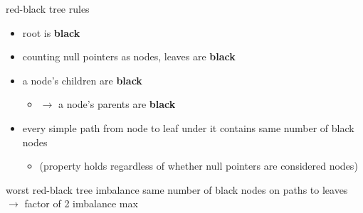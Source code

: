 \begin{frame}{red-black tree rules}
    \begin{itemize}
    \item root is \textbf{black}
    \item counting null pointers as nodes, leaves are \textbf{black}
    \item a  node's children are \textbf{black}
        \begin{itemize}
            \item $\rightarrow$ a  node's parents are \textbf{black}
        \end{itemize}
    \item every simple path from node to leaf under it contains same number of black nodes
            \begin{itemize}
                \item (property holds regardless of whether null pointers are considered nodes)
            \end{itemize}
    \end{itemize}
\end{frame}


\begin{frame}{worst red-black tree imbalance}
same number of black nodes on paths to leaves \\
    $\rightarrow$ factor of 2 imbalance max \\
\end{frame}


